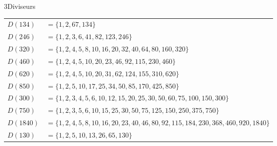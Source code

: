 \begin{exercice}{3}{Diviseurs}
\medskip
{}%
{\def\arraystretch{1.2}
\begin{tabularx}{\linewidth}{lX}
$D(134)$  & $= \{1, 2, 67, 134\}$ \\
$D(246)$  & $= \{1, 2, 3, 6, 41, 82, 123, 246\}$ \\
$D(320)$  & $= \{1, 2, 4, 5, 8, 10, 16, 20, 32, 40, 64, 80, 160, 320\}$ \\
$D(460)$  & $= \{1, 2, 4, 5, 10, 20, 23, 46, 92, 115, 230, 460\}$ \\
$D(620)$  & $= \{1, 2, 4, 5, 10, 20, 31, 62, 124, 155, 310, 620\}$ \\
$D(850)$  & $= \{1, 2, 5, 10, 17, 25, 34, 50, 85, 170, 425, 850\}$ \\
$D(300)$  & $= \{1, 2, 3, 4, 5, 6, 10, 12, 15, 20, 25, 30, 50, 60, 75, 100, 150, 300\}$ \\
$D(750)$  & $= \{1, 2, 3, 5, 6, 10, 15, 25, 30, 50, 75, 125, 150, 250, 375, 750\}$ \\
$D(1840)$ & $= \{1, 2, 4, 5, 8, 10, 16, 20, 23, 40, 46, 80, 92, 115, 184, 230, 368, 460, 920, 1840\}$ \\
$D(130)$  & $= \{1, 2, 5, 10, 13, 26, 65, 130\}$ \\
\end{tabularx}
\def\arraystretch{1}}

\end{exercice}


